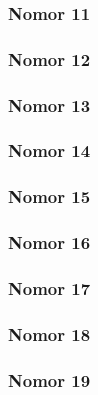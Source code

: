 \subsubsection{Nomor 11}
\hfill\break



\subsubsection{Nomor 12}
\hfill\break



\subsubsection{Nomor 13}
\hfill\break



\subsubsection{Nomor 14}
\hfill\break



\subsubsection{Nomor 15}
\hfill\break



\subsubsection{Nomor 16}
\hfill\break



\subsubsection{Nomor 17}
\hfill\break


\subsubsection{Nomor 18}
\hfill\break



\subsubsection{Nomor 19}
\hfill\break



